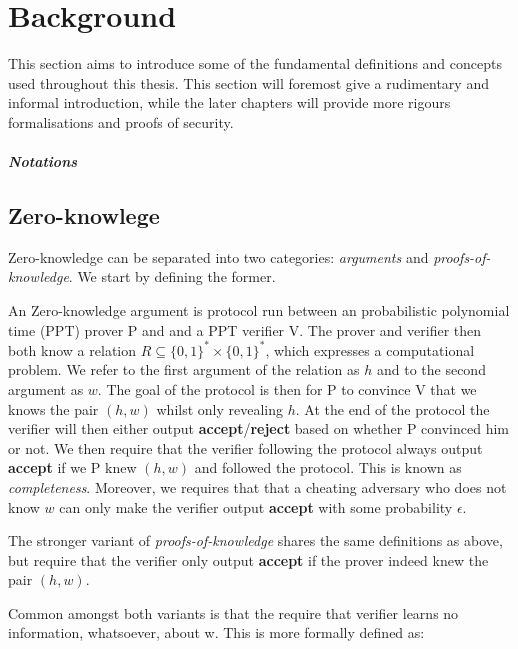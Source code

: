 \chapter{Background}
\label{ch:background}
This section aims to introduce some of the fundamental definitions and concepts
used throughout this thesis. This section will foremost give a rudimentary and
informal introduction, while the later chapters will provide more rigours
formalisations and proofs of security.
%

\paragraph{Notations}

\section{Zero-knowlege}
\label{sec:background:zero-knowledge}
Zero-knowledge can be separated into two categories: \textit{arguments} and
\textit{proofs-of-knowledge}. We start by defining the former.

An Zero-knowledge argument is protocol run between an probabilistic polynomial
time (PPT) prover P and and a PPT verifier V. The prover and verifier then both
know a relation $R \subseteq \{0,1\}^{*} \times \{0,1\}^*$, which expresses a
computational problem. We refer to the first argument of the relation as $h$ and
to the second argument as $w$.
The goal of the protocol is then for P to convince V that we knows the pair
$(h,w)$ whilst only revealing $h$. At the end of the protocol the verifier will
then either output \textbf{accept}/\textbf{reject} based on whether P convinced
him or not.
We then require that the verifier following the protocol always output
\textbf{accept} if we P knew $(h,w)$ and followed the protocol. This is known as \textit{completeness}.
Moreover, we requires that that a cheating adversary who does not know $w$ can
only make the verifier output \textbf{accept} with some probability $\epsilon$.

The stronger variant of \textit{proofs-of-knowledge} shares the same definitions
as above, but require that the verifier only output \textbf{accept} if the
prover indeed knew the pair $(h,w)$.


Common amongst both variants is that the require that verifier learns no
information, whatsoever, about w. This is more formally defined as:

